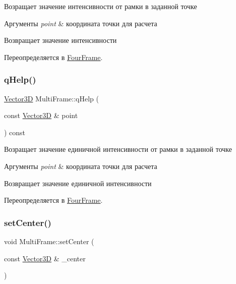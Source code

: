 Возращает значение интенсивности от рамки в заданной точке 
\begin{DoxyParams}{Аргументы}
{\em point} & координата точки для расчета \\
\hline
\end{DoxyParams}
\begin{DoxyReturn}{Возвращает}
значение интенсивности 
\end{DoxyReturn}


Переопределяется в \mbox{\hyperlink{class_four_frame_af3eabfc6f9c3315f5475d66af3cf2630}{Four\+Frame}}.

\mbox{\label{class_multi_frame_a8da38b4d64ae762dfcb995911031ebf8}} 
\subsubsection{\texorpdfstring{q\+Help()}{qHelp()}}
{\footnotesize\ttfamily \mbox{\hyperlink{class_vector3_d}{Vector3D}} Multi\+Frame\+::q\+Help (\begin{DoxyParamCaption}\item[{const \mbox{\hyperlink{class_vector3_d}{Vector3D}} \&}]{point }\end{DoxyParamCaption}) const\hspace{0.3cm}{\ttfamily [virtual]}}

Возращает значение единичной интенсивности от рамки в заданной точке 
\begin{DoxyParams}{Аргументы}
{\em point} & координата точки для расчета \\
\hline
\end{DoxyParams}
\begin{DoxyReturn}{Возвращает}
значение единичной интенсивности 
\end{DoxyReturn}


Переопределяется в \mbox{\hyperlink{class_four_frame_aa6339751887314ff05ca479255b21432}{Four\+Frame}}.

\mbox{\label{class_multi_frame_a7a89904f35c2d3e87f38e9c207a58f61}} 
\subsubsection{\texorpdfstring{set\+Center()}{setCenter()}}
{\footnotesize\ttfamily void Multi\+Frame\+::set\+Center (\begin{DoxyParamCaption}\item[{const \mbox{\hyperlink{class_vector3_d}{Vector3D}} \&}]{\+\_\+center }\end{DoxyParamCaption})\hspace{0.3cm}{\ttfamily [virtual]}}

